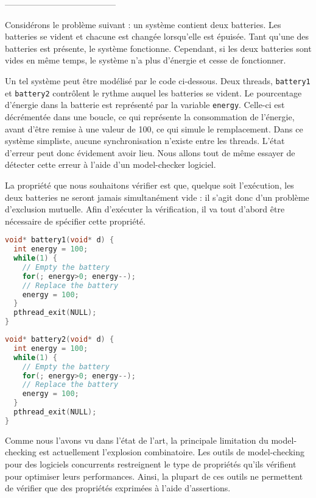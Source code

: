 ---------------------------------------

Considérons le problème suivant : un système contient deux batteries. Les
batteries se vident et chacune est changée lorsqu'elle est épuisée. Tant qu'une
des batteries est présente, le système fonctionne. Cependant, si les deux
batteries sont vides en même temps, le système n'a plus d'énergie et cesse de
fonctionner.

Un tel système peut être modélisé par le code ci-dessous. Deux threads,
\texttt{battery1} et \texttt{battery2} contrôlent le rythme auquel les
batteries se vident. Le pourcentage d'énergie dans la batterie est représenté
par la variable \texttt{energy}. Celle-ci est décrémentée dans une
boucle, ce qui représente la consommation de l'énergie, avant d'être remise à
une valeur de 100, ce qui simule le remplacement. Dans ce système simpliste,
aucune synchronisation n'existe entre les threads. L'état d'erreur peut donc
évidement avoir lieu. Nous allons tout de même essayer de détecter cette erreur
à l'aide d'un model-checker logiciel.

La propriété que nous souhaitons vérifier est que, quelque soit
l'exécution, les deux batteries ne seront jamais simultanément vide : il
s'agit donc d'un problème d'exclusion mutuelle. Afin d'exécuter la
vérification, il va tout d'abord être nécessaire de spécifier cette
propriété.

\noindent\begin{minipage}{.45\textwidth}
\begin{lstlisting}[language=C, frame=single, caption=Thread 1]
void* battery1(void* d) {
  int energy = 100;
  while(1) {
    // Empty the battery
    for(; energy>0; energy--);
    // Replace the battery
    energy = 100;
  }
  pthread_exit(NULL);
}
\end{lstlisting}
\end{minipage}\hfill
\begin{minipage}{.45\textwidth}
\begin{lstlisting}[language=C, frame=single, caption=Thread 2]
void* battery2(void* d) {
  int energy = 100;
  while(1) {
    // Empty the battery
    for(; energy>0; energy--);
    // Replace the battery
    energy = 100;
  }
  pthread_exit(NULL);
}
\end{lstlisting}
\end{minipage}

Comme nous l'avons vu dans l'état de l'art, la principale limitation du
model-checking est actuellement l'explosion combinatoire. Les outils de
model-checking pour des logiciels concurrents restreignent le type de
propriétés qu'ils vérifient pour optimiser leurs performances. Ainsi, la
plupart de ces outils ne permettent de vérifier que des propriétés
exprimées à l'aide d'assertions.


